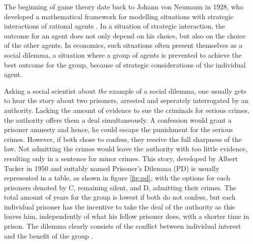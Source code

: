 %
%
%
%

The beginning of game theory date back to Johann von Neumann in 1928,
who developed a mathematical framework
for modelling situations with strategic interactions of rational agents 
\parencite{v._neumann_zur_1928}.
In a situation of strategic interaction, the outcome for an agent does not
only depend on his choice, but also on the choice of the other agents.
In economics, such situations often present themselves as a social dilemma,
a situation where a group of agents is prevented to achieve the best
outcome for the group, because of strategic considerations of the individual
agent.

Asking a social scientist about \textit{the} example of a social dilemma, 
one usually gets to hear the story about two prisoners, arrested and 
seperately interrogated by an authority. Lacking the amount of evidence to sue 
the criminals for serious crimes, the authority offers them a deal 
simultaneously.
A confession would grant a prisoner amnesty and hence, he could escape the 
punishment for the serious crimes. However, if both chose to confess, 
they receive the
full sharpness of the law. Not admitting the crimes would leave the authority
with too little evidence, resulting only in a sentence for minor crimes.
This story, developed by Albert Tucker in 1950 and suitably named Prisoner's
Dilemma (PD) is usually represented in a table, as shown in figure \ref{fig:pd}, with
the options for each prisoners denoted by C, remaining silent, and D, admitting
their crimes. 
The total amount of years for the group is lowest if both do not confess, 
but each individual prisoner has the 
incentive to take the deal of the authority as this leaves him, independently
of what his fellow prisoner does, with a shorter time in prison. The dilemma 
clearly consists of the conflict between individual interest and 
the benefit of the group \parencite{skyrms_stag_2004}. 

